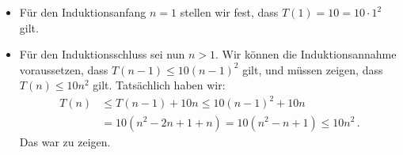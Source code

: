 \documentclass[a4paper,11pt,oneside,ngerman]{scrartcl}
\begin{document}
\begin{itemize}
  \item Für den Induktionsanfang $n=1$ stellen wir fest, dass $T(1)=10=10 \cdot 1^2$ gilt.
  \item Für den Induktionsschluss sei nun $n>1$. Wir können die Induktionsannahme voraussetzen, dass $T(n-1)\le 10 (n-1)^2$ gilt, und müssen zeigen, dass $T(n)\le 10n^2$ gilt. Tatsächlich haben wir:
  \begin{align*}
    T(n) &\le T(n-1)+10n
    \le 10(n-1)^2 + 10n\\
    &= 10 (n^2-2n+1+n)
    = 10 (n^2-n+1) \le 10 n^2\,.
  \end{align*}
  Das war zu zeigen.
\end{itemize}



\end{document}
